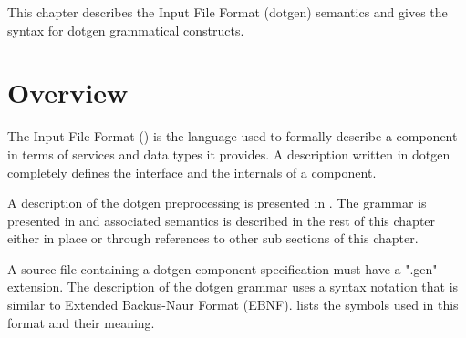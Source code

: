 %
%
%
%
%

This chapter describes the \GenoM{} Input File Format (dotgen) semantics and
gives the syntax for dotgen grammatical constructs.

\section{Overview}

The \GenoM{}  Input File Format ()  is the language  used to formally
describe a \GenoM{} component in terms  of services and data types it provides.
A  description written  in  dotgen  completely defines  the  interface and  the
internals of a component.

A    description    of   the    dotgen    preprocessing    is   presented    in
. The grammar is presented
in        and   associated
semantics is described  in the rest of this chapter either  in place or through
references to other sub sections of this chapter.

A source  file containing a dotgen  component specification must  have a ".gen"
extension. The description of the dotgen grammar uses a syntax notation that is
similar        to       Extended        Backus-Naur        Format       (EBNF).
  lists  the  symbols used  in
this format and their meaning.

